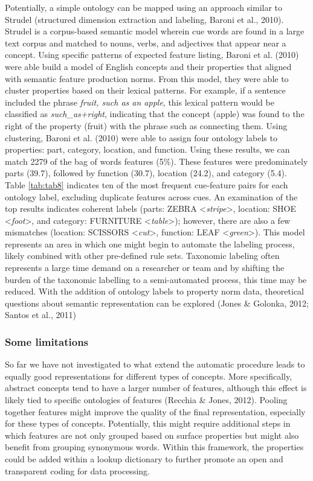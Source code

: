 \documentclass[man]{apa6}
\begin{document}
Potentially, a simple ontology can be mapped using an approach similar to Strudel (structured dimension extraction and labeling, Baroni et al., 2010). Strudel is a corpus-based semantic model wherein cue words are found in a large text corpus and matched to nouns, verbs, and adjectives that appear near a concept. Using specific patterns of expected feature listing, Baroni et al. (2010) were able build a model of English concepts and their properties that aligned with semantic feature production norms. From this model, they were able to cluster properties based on their lexical patterns. For example, if a sentence included the phrase \emph{fruit, such as an apple}, this lexical pattern would be classified as \emph{such\_as+right}, indicating that the concept (apple) was found to the right of the property (fruit) with the phrase such as connecting them. Using clustering, Baroni et al. (2010) were able to assign four ontology labels to properties: part, category, location, and function. Using these results, we can match 2279 of the bag of words features (5\%). These features were predominately parts (39.7), followed by function (30.7), location (24.2), and category (5.4). Table \ref{tab:tab8} indicates ten of the most frequent cue-feature pairs for each ontology label, excluding duplicate features across cues. An examination of the top results indicates coherent labels (parts: ZEBRA \textless{}\emph{stripe}\textgreater{}, location: SHOE \textless{}\emph{foot}\textgreater{}, and category: FURNITURE \textless{}\emph{table}\textgreater{}); however, there are also a few mismatches (location: SCISSORS \textless{}\emph{cut}\textgreater{}, function: LEAF \textless{}\emph{green}\textgreater{}). This model represents an area in which one might begin to automate the labeling process, likely combined with other pre-defined rule sets. Taxonomic labeling often represents a large time demand on a researcher or team and by shifting the burden of the taxonomic labelling to a semi-automated process, this time may be reduced. With the addition of ontology labels to property norm data, theoretical questions about semantic representation can be explored (Jones \& Golonka, 2012; Santos et al., 2011)

\hypertarget{some-limitations}{%
\subsubsection{Some limitations}\label{some-limitations}}

So far we have not investigated to what extend the automatic procedure leads to equally good representations for different types of concepts. More specifically, abstract concepts tend to have a larger number of features, although this effect is likely tied to specific ontologies of features (Recchia \& Jones, 2012). Pooling together features might improve the quality of the final representation, especially for these types of concepts. Potentially, this might require additional steps in which features are not only grouped based on surface properties but might also benefit from grouping synonymous words. Within this framework, the properties could be added within a lookup dictionary to further promote an open and transparent coding for data processing.
\end{document}
